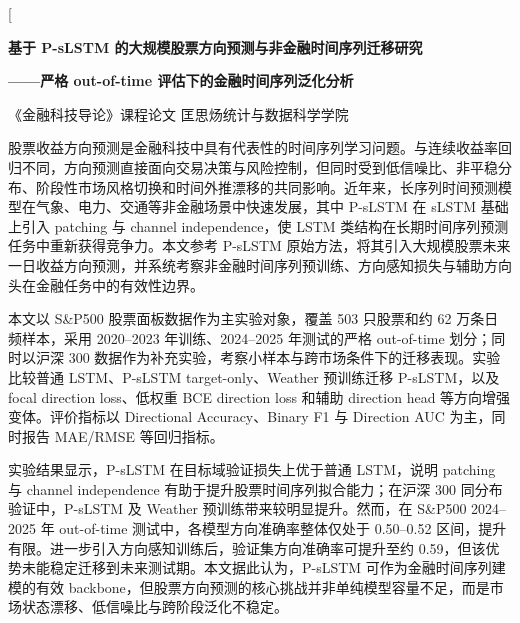 \documentclass[UTF8,zihao=-4,twocolumn,fontset=fandol]{ctexart}
\newcommand{\studentid}{23089088}
\newcommand{\studentname}{匡思炀}
\newcommand{\college}{统计与数据科学学院}
\newcommand{\coursename}{金融科技导论}
\newcommand{\papertitle}{基于 P-sLSTM 的大规模股票方向预测与非金融时间序列迁移研究}
\newcommand{\papersubtitle}{严格 out-of-time 评估下的金融时间序列泛化分析}
\begin{document}
\justifying
\thispagestyle{fancy}

\twocolumn[
\begin{center}
{\bfseries{} \papertitle\par}
\vspace{0.4em}
{\bfseries{} ——\papersubtitle\par}
\vspace{0.5em}
{《\coursename》课程论文 \quad \studentid\studentname \quad \college\par}
\end{center}

\vspace{0.4em}

\vspace{0.2em}

{
股票收益方向预测是金融科技中具有代表性的时间序列学习问题。与连续收益率回归不同，方向预测直接面向交易决策与风险控制，但同时受到低信噪比、非平稳分布、阶段性市场风格切换和时间外推漂移的共同影响。近年来，长序列时间预测模型在气象、电力、交通等非金融场景中快速发展，其中 P-sLSTM 在 sLSTM 基础上引入 patching 与 channel independence，使 LSTM 类结构在长期时间序列预测任务中重新获得竞争力。本文参考 P-sLSTM 原始方法，将其引入大规模股票未来一日收益方向预测，并系统考察非金融时间序列预训练、方向感知损失与辅助方向头在金融任务中的有效性边界。

本文以 S\&P500 股票面板数据作为主实验对象，覆盖 503 只股票和约 62 万条日频样本，采用 2020--2023 年训练、2024--2025 年测试的严格 out-of-time 划分；同时以沪深 300 数据作为补充实验，考察小样本与跨市场条件下的迁移表现。实验比较普通 LSTM、P-sLSTM target-only、Weather 预训练迁移 P-sLSTM，以及 focal direction loss、低权重 BCE direction loss 和辅助 direction head 等方向增强变体。评价指标以 Directional Accuracy、Binary F1 与 Direction AUC 为主，同时报告 MAE/RMSE 等回归指标。

实验结果显示，P-sLSTM 在目标域验证损失上优于普通 LSTM，说明 patching 与 channel independence 有助于提升股票时间序列拟合能力；在沪深 300 同分布验证中，P-sLSTM 及 Weather 预训练带来较明显提升。然而，在 S\&P500 2024--2025 年 out-of-time 测试中，各模型方向准确率整体仅处于 0.50--0.52 区间，提升有限。进一步引入方向感知训练后，验证集方向准确率可提升至约 0.59，但该优势未能稳定迁移到未来测试期。本文据此认为，P-sLSTM 可作为金融时间序列建模的有效 backbone，但股票方向预测的核心挑战并非单纯模型容量不足，而是市场状态漂移、低信噪比与跨阶段泛化不稳定。
\par}
\end{document}
